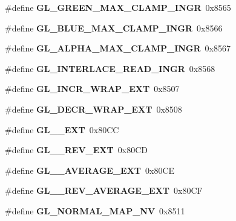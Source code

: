 \begin{DoxyCompactItemize}
\item 
\#define {\bfseries G\+L\+\_\+\+G\+R\+E\+E\+N\+\_\+\+M\+A\+X\+\_\+\+C\+L\+A\+M\+P\+\_\+\+I\+N\+G\+R}~0x8565\label{_s_d_l__opengl_8h_a3f1547a5959faba8eb8673aa5afdaf3a}

\item 
\#define {\bfseries G\+L\+\_\+\+B\+L\+U\+E\+\_\+\+M\+A\+X\+\_\+\+C\+L\+A\+M\+P\+\_\+\+I\+N\+G\+R}~0x8566\label{_s_d_l__opengl_8h_a9fe90b7f4cc72d2db2ce66abd6bfd875}

\item 
\#define {\bfseries G\+L\+\_\+\+A\+L\+P\+H\+A\+\_\+\+M\+A\+X\+\_\+\+C\+L\+A\+M\+P\+\_\+\+I\+N\+G\+R}~0x8567\label{_s_d_l__opengl_8h_a6dde469b1fecde15622a52bef0f86137}

\item 
\#define {\bfseries G\+L\+\_\+\+I\+N\+T\+E\+R\+L\+A\+C\+E\+\_\+\+R\+E\+A\+D\+\_\+\+I\+N\+G\+R}~0x8568\label{_s_d_l__opengl_8h_a5d564df66c87dbc2d9521af7e053058e}

\item 
\#define {\bfseries G\+L\+\_\+\+I\+N\+C\+R\+\_\+\+W\+R\+A\+P\+\_\+\+E\+X\+T}~0x8507\label{_s_d_l__opengl_8h_a5704af45db2b9c64a8ca3e9c983f6471}

\item 
\#define {\bfseries G\+L\+\_\+\+D\+E\+C\+R\+\_\+\+W\+R\+A\+P\+\_\+\+E\+X\+T}~0x8508\label{_s_d_l__opengl_8h_a8ff9ae02e45839045dafc77056d0ee93}

\item 
\#define {\bfseries G\+L\+\_\+\_\+\+E\+X\+T}~0x80\+C\+C\label{_s_d_l__opengl_8h_aad503453be8635ce634e74657b7a2592}

\item 
\#define {\bfseries G\+L\+\_\+\_\+\+R\+E\+V\+\_\+\+E\+X\+T}~0x80\+C\+D\label{_s_d_l__opengl_8h_a77c00d20089a5af8d25c86355635d71e}

\item 
\#define {\bfseries G\+L\+\_\+\_\+\+A\+V\+E\+R\+A\+G\+E\+\_\+\+E\+X\+T}~0x80\+C\+E\label{_s_d_l__opengl_8h_a95d2ac32e0528175190f173671bd66ce}

\item 
\#define {\bfseries G\+L\+\_\+\_\+\+R\+E\+V\+\_\+\+A\+V\+E\+R\+A\+G\+E\+\_\+\+E\+X\+T}~0x80\+C\+F\label{_s_d_l__opengl_8h_afaa3d818e1b68101b8bda1d334b67198}

\item 
\#define {\bfseries G\+L\+\_\+\+N\+O\+R\+M\+A\+L\+\_\+\+M\+A\+P\+\_\+\+N\+V}~0x8511\label{_s_d_l__opengl_8h_ac0b31313ba0bc6444de2b6b899b7fc6c}


\end{DoxyCompactItemize}
